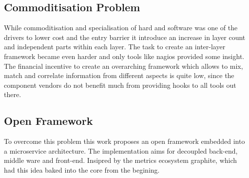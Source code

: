 \subsection{Commoditisation Problem}
While commoditisation and specialisation of hard and software was one of the drivers to lower cost and the entry barrier it introduce an increase in layer count and
independent parts within each layer. The task to create an inter-layer framework became even harder and only tools like \gls{nagios} provided some insight.
The financial incentive to create an overarching framework which allows to mix, match and correlate information from different aspects is quite low, since the component vendors
do not benefit much from providing hooks to all tools out there.

\subsection{Open Framework}
To overcome this problem this work proposes an open framework embedded into a microservice architecture. The implementation aims for decoupled back-end, middle ware and front-end.
Insipred by the metrics ecosystem graphite, which had this idea baked into the core from the begining.